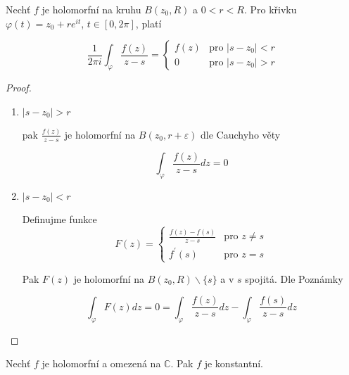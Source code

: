 \begin{vetal}
\label{Cauchyův vzorec}
Nechť $f$ je holomorfní na kruhu $B(z_0, R)$ a $0<r<R$. Pro křivku $\varphi(t) = z_0 + r e^{it}$, $t \in [0,2\pi]$, platí

\begin{equation}
\frac{1}{2 \pi i} \int_\varphi \frac{f(z)}{z-s}  = \left\{ \begin{array}{ll}
 f(z) & \textrm{pro $|s-z_0| < r$} \nonumber\\
 0 & \textrm{pro $| s-z_0 | > r$}
  \end{array} \right.
\end{equation}
\end{vetal}

\begin{proof}
\begin{enumerate}
\item $|s-z_0| > r$

pak $\frac{f(z)}{z-s}$ je holomorfní na $B(z_0, r + \varepsilon)$ dle Cauchyho věty

$$\int_\varphi \frac{f(z)}{z-s} dz = 0$$

\item $|s-z_0| < r$

Definujme funkce 
\begin{equation}
F(z)  = \left\{ \begin{array}{ll}
 \frac{f(z)-f(s)}{z-s} & \textrm{pro $z \neq s$} \nonumber\\
 f^\prime(s) & \textrm{pro $z=s$}
  \end{array} \right.
\end{equation}

Pak $F(z)$ je holomorfní na $B(z_0, R) \backslash \{ s \}$ a v $s$ spojitá. Dle Poznámky

$$\int_\varphi F(z) dz = 0 = \int_\varphi \frac{f(z)}{z-s} dz - \int_\varphi \frac{f(s)}{z-s} dz$$
\end{enumerate}
\end{proof}


\begin{vetat}[Liouville]
\label{Liouville}
Nechť $f$ je holomorfní a omezená na $\mathbb{C}$. Pak $f$ je konstantní.
\end{vetat}

